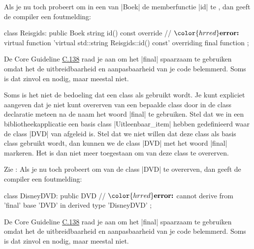 \begin{cpplstShortInline}
Als je nu toch probeert om in een  van |Boek| de memberfunctie |id| te , dan
geeft de compiler een foutmelding:
\begin{cpplstfragment}[mathescape=true]
class Reisgids: public Boek {
    string id() const override {
//  $\color{hrred}\textbf{error:}$ virtual function 'virtual std::string Reisgids::id() const' overriding final function 
    }
};
\end{cpplstfragment}

De \Cpp{} Core Guideline \href{https://isocpp.github.io/CppCoreGuidelines/CppCoreGuidelines\#c139-use-final-sparingly}{C.138} raad je aan om het  |final| spaarzaam te gebruiken omdat het de uitbreidbaarheid en aanpasbaarheid van je code belemmerd.
Soms is dat zinvol en nodig, maar meestal niet.

Soms is het niet de bedoeling dat een class als  gebruikt wordt. Je kunt expliciet aangeven dat je niet kunt overerven van een bepaalde class door in de class declaratie meteen na de naam het woord |final| te gebruiken. Stel dat we in een bibliotheekapplicatie een basis class |Uitleenbaar_item| hebben gedefinieerd waar de class |DVD| van afgeleid is. Stel dat we niet willen dat deze class als basis class gebruikt wordt, dan kunnen we de class |DVD| met het woord |final| markeren. Het is dan niet meer toegestaan om van deze class te overerven.

Zie :
\iftoggle{ebook}{%
	\needspace{4\baselineskip}
}{%
	\needspace{4cm}
}
Als je nu toch probeert om van de class |DVD| te overerven, dan
geeft de compiler een foutmelding:
\begin{cpplstfragment}[mathescape=true]
class DisneyDVD: public DVD {
//  $\color{hrred}\textbf{error:}$ cannot derive from 'final' base 'DVD' in derived type 'DisneyDVD' 
};
\end{cpplstfragment}

De \Cpp{} Core Guideline \href{https://isocpp.github.io/CppCoreGuidelines/CppCoreGuidelines\#c139-use-final-sparingly}{C.138} raad je aan om het  |final| spaarzaam te gebruiken omdat het de uitbreidbaarheid en aanpasbaarheid van je code belemmerd.
Soms is dat zinvol en nodig, maar meestal niet.


\end{cpplstShortInline}
